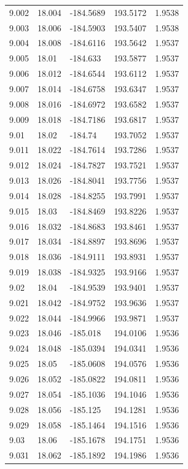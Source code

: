 \begin{tabular}{lllll}
9.002 & 18.004 & -184.5689 & 193.5172 & 1.9538 \\
9.003 & 18.006 & -184.5903 & 193.5407 & 1.9538 \\
9.004 & 18.008 & -184.6116 & 193.5642 & 1.9537 \\
9.005 & 18.01 & -184.633 & 193.5877 & 1.9537 \\
9.006 & 18.012 & -184.6544 & 193.6112 & 1.9537 \\
9.007 & 18.014 & -184.6758 & 193.6347 & 1.9537 \\
9.008 & 18.016 & -184.6972 & 193.6582 & 1.9537 \\
9.009 & 18.018 & -184.7186 & 193.6817 & 1.9537 \\
9.01 & 18.02 & -184.74 & 193.7052 & 1.9537 \\
9.011 & 18.022 & -184.7614 & 193.7286 & 1.9537 \\
9.012 & 18.024 & -184.7827 & 193.7521 & 1.9537 \\
9.013 & 18.026 & -184.8041 & 193.7756 & 1.9537 \\
9.014 & 18.028 & -184.8255 & 193.7991 & 1.9537 \\
9.015 & 18.03 & -184.8469 & 193.8226 & 1.9537 \\
9.016 & 18.032 & -184.8683 & 193.8461 & 1.9537 \\
9.017 & 18.034 & -184.8897 & 193.8696 & 1.9537 \\
9.018 & 18.036 & -184.9111 & 193.8931 & 1.9537 \\
9.019 & 18.038 & -184.9325 & 193.9166 & 1.9537 \\
9.02 & 18.04 & -184.9539 & 193.9401 & 1.9537 \\
9.021 & 18.042 & -184.9752 & 193.9636 & 1.9537 \\
9.022 & 18.044 & -184.9966 & 193.9871 & 1.9537 \\
9.023 & 18.046 & -185.018 & 194.0106 & 1.9536 \\
9.024 & 18.048 & -185.0394 & 194.0341 & 1.9536 \\
9.025 & 18.05 & -185.0608 & 194.0576 & 1.9536 \\
9.026 & 18.052 & -185.0822 & 194.0811 & 1.9536 \\
9.027 & 18.054 & -185.1036 & 194.1046 & 1.9536 \\
9.028 & 18.056 & -185.125 & 194.1281 & 1.9536 \\
9.029 & 18.058 & -185.1464 & 194.1516 & 1.9536 \\
9.03 & 18.06 & -185.1678 & 194.1751 & 1.9536 \\
9.031 & 18.062 & -185.1892 & 194.1986 & 1.9536 \\

\end{tabular}
